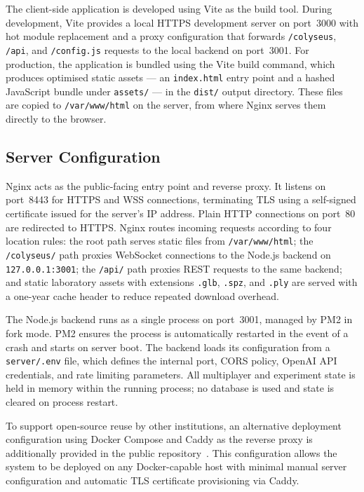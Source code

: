The client-side application is developed using Vite as the build tool.
During development, Vite provides a local HTTPS development server on
port~3000 with hot module replacement and a proxy configuration that
forwards \texttt{/colyseus}, \texttt{/api}, and \texttt{/config.js}
requests to the local backend on port~3001. For production, the
application is bundled using the Vite build command, which produces
optimised static assets --- an \texttt{index.html} entry point and a
hashed JavaScript bundle under \texttt{assets/} --- in the \texttt{dist/}
output directory. These files are copied to \texttt{/var/www/html} on the
server, from where Nginx serves them directly to the browser.

\subsection{Server Configuration}
\label{sec:server_config}

Nginx acts as the public-facing entry point and reverse proxy. It listens
on port~8443 for HTTPS and WSS connections, terminating TLS using a
self-signed certificate issued for the server's IP address. Plain HTTP
connections on port~80 are redirected to HTTPS. Nginx routes incoming
requests according to four location rules: the root path serves static
files from \texttt{/var/www/html}; the \texttt{/colyseus/} path proxies
WebSocket connections to the Node.js backend on
\texttt{127.0.0.1:3001}; the \texttt{/api/} path proxies REST requests
to the same backend; and static laboratory assets with extensions
\texttt{.glb}, \texttt{.spz}, and \texttt{.ply} are served with a
one-year cache header to reduce repeated download overhead.

The Node.js backend runs as a single process on port~3001, managed by
PM2 in fork mode. PM2 ensures the process is automatically restarted in
the event of a crash and starts on server boot. The backend loads its
configuration from a \texttt{server/.env} file, which defines the
internal port, CORS policy, OpenAI API credentials, and rate limiting
parameters. All multiplayer and experiment state is held in memory within
the running process; no database is used and state is cleared on process
restart.

To support open-source reuse by other institutions, an alternative
deployment configuration using Docker Compose and Caddy as the reverse
proxy is additionally provided in the public repository~\cite{thesisRepo}.
This configuration allows the system to be deployed on any Docker-capable
host with minimal manual server configuration and automatic TLS
certificate provisioning via Caddy.

